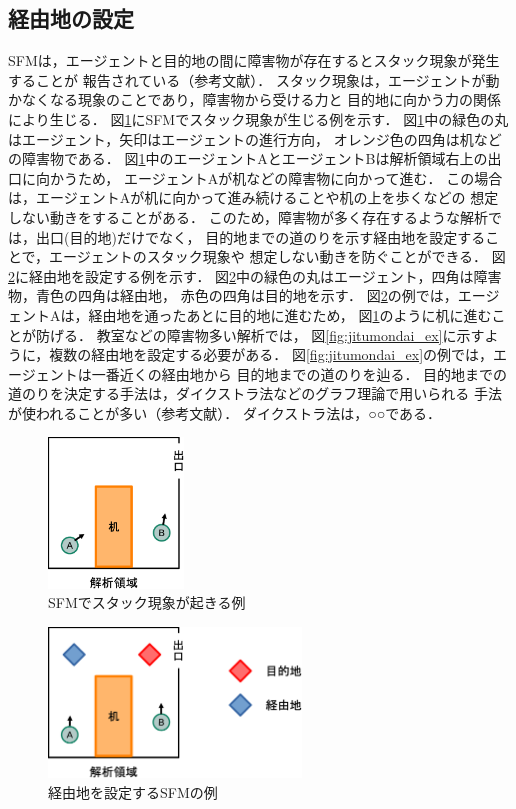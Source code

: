\subsection{経由地の設定}
SFMは，エージェントと目的地の間に障害物が存在するとスタック現象が発生することが
報告されている（参考文献）．
スタック現象は，エージェントが動かなくなる現象のことであり，障害物から受ける力と
目的地に向かう力の関係により生じる．
図\ref{fig:sutakku_ex}にSFMでスタック現象が生じる例を示す．
図\ref{fig:sutakku_ex}中の緑色の丸はエージェント，矢印はエージェントの進行方向，
オレンジ色の四角は机などの障害物である．
図\ref{fig:sutakku_ex}中のエージェントAとエージェントBは解析領域右上の出口に向かうため，
エージェントAが机などの障害物に向かって進む．
この場合は，エージェントAが机に向かって進み続けることや机の上を歩くなどの
想定しない動きをすることがある．
このため，障害物が多く存在するような解析では，出口(目的地)だけでなく，
目的地までの道のりを示す経由地を設定することで，エージェントのスタック現象や
想定しない動きを防ぐことができる．
図\ref{fig:keiyuti_ex}に経由地を設定する例を示す．
図\ref{fig:keiyuti_ex}中の緑色の丸はエージェント，四角は障害物，青色の四角は経由地，
赤色の四角は目的地を示す．
図\ref{fig:keiyuti_ex}の例では，エージェントAは，経由地を通ったあとに目的地に進むため，
図\ref{fig:sutakku_ex}のように机に進むことが防げる．
教室などの障害物多い解析では，
図\ref{fig:jitumondai_ex}に示すように，複数の経由地を設定する必要がある．
図\ref{fig:jitumondai_ex}の例では，エージェントは一番近くの経由地から
目的地までの道のりを辿る．
目的地までの道のりを決定する手法は，ダイクストラ法などのグラフ理論で用いられる
手法が使われることが多い（参考文献）．
ダイクストラ法は，○○である．



\begin{figure}[hbtp]
 \begin{center}
  \includegraphics[height=4cm,clip]{figure/sutakku_ex.eps}
  \caption{SFMでスタック現象が起きる例}
  \label{fig:sutakku_ex}
 \end{center}
\end{figure}

\begin{figure}[hbtp]
 \begin{center}
  \includegraphics[height=4cm,clip]{figure/keiyuti_ex.eps}
  \caption{経由地を設定するSFMの例}
  \label{fig:keiyuti_ex}
 \end{center}
\end{figure}

